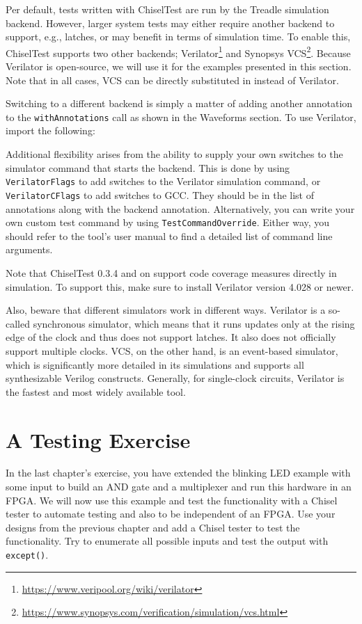 \documentclass[%
    10pt,
    headinclude, footexclude,
    openright, %
    notitlepage,
    cleardoubleempty,
    headsepline,
    pointlessnumbers,
    bibtotoc, idxtotoc,
    ]{scrbook}
\newcommand{\code}[1]{{\small{\texttt{#1}}}}
\newcommand{\myref}[2]{\href{#1}{#2}}
\renewcommand{\myref}[2]{{#2}{\footnote{\url{#1}}}}
\begin{document}
Per default, tests written with ChiselTest are run by the Treadle simulation backend. However, 
larger system tests may either require another backend to support, e.g., latches, or may 
benefit in terms of simulation time. To enable this, ChiselTest supports two other backends; 
\myref{https://www.veripool.org/wiki/verilator}{Verilator} and 
\myref{https://www.synopsys.com/verification/simulation/vcs.html}{Synopsys VCS}. Because 
Verilator is open-source, we will use it for the examples presented in this section. Note 
that in all cases, VCS can be directly substituted in instead of Verilator.

Switching to a different backend is simply a matter of adding another annotation to the 
\code{withAnnotations} call as shown in the Waveforms section. To use Verilator, import 
the following:


Additional flexibility arises from the ability to supply your own switches to the 
simulator command that starts the backend. This is done by using \code{VerilatorFlags} 
to add switches to the Verilator simulation command, or \code{VerilatorCFlags} to add 
switches to GCC. They should be in the list of annotations along with the backend 
annotation. Alternatively, you can write your own custom test command by using 
\code{TestCommandOverride}. Either way, you should refer to the tool's user manual 
to find a detailed list of command line arguments.

Note that ChiselTest 0.3.4 and on support code coverage measures directly in simulation. 
To support this, make sure to install Verilator version 4.028 or newer.

Also, beware that different simulators work in different ways. Verilator is a so-called 
synchronous simulator, which means that it runs updates only at the rising edge of the 
clock and thus does not support latches. It also does not officially support multiple 
clocks. VCS, on the other hand, is an event-based simulator, which is significantly more 
detailed in its simulations and supports all synthesizable Verilog constructs. 
Generally, for single-clock circuits, Verilator is the fastest and 
most widely available tool.

\section{A Testing Exercise}

In the last chapter's exercise, you have extended the blinking LED example with some input
to build an AND gate and a multiplexer and run this hardware in an FPGA.
We will now use this example and test the functionality with a Chisel tester
to automate testing and also to be independent of an FPGA.
Use your designs from the previous chapter and add a Chisel tester to test the functionality.
Try to enumerate all possible inputs and test the output with \code{except()}.
\end{document}
